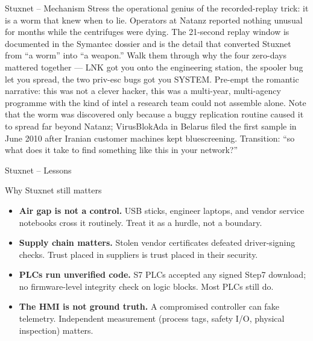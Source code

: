 \documentclass[aspectratio=169,11pt]{beamer}
\begin{document}
\begin{frame}{Stuxnet -- Mechanism}
{  Stress the operational genius of the recorded-replay trick: it is a worm that knew when to lie. Operators at Natanz reported nothing unusual for months while the centrifuges were dying. The 21-second replay window is documented in the Symantec dossier and is the detail that converted Stuxnet from ``a worm'' into ``a weapon.'' Walk them through why the four zero-days mattered together --- LNK got you onto the engineering station, the spooler bug let you spread, the two priv-esc bugs got you SYSTEM. Pre-empt the romantic narrative: this was not a clever hacker, this was a multi-year, multi-agency programme with the kind of intel a research team could not assemble alone. Note that the worm was discovered only because a buggy replication routine caused it to spread far beyond Natanz; VirusBlokAda in Belarus filed the first sample in June 2010 after Iranian customer machines kept bluescreening. Transition: ``so what does it take to find something like this in your network?''
}
\end{frame}

\begin{frame}{Stuxnet -- Lessons}
\begin{takeawaybox}{Why Stuxnet still matters}
\begin{itemize}\setlength{\itemsep}{2pt}
  \item \textbf{Air gap is not a control.} USB sticks, engineer laptops, and vendor service notebooks cross it routinely. Treat it as a hurdle, not a boundary.
  \item \textbf{Supply chain matters.} Stolen vendor certificates defeated driver-signing checks. Trust placed in suppliers is trust placed in their security.
  \item \textbf{PLCs run unverified code.} S7 PLCs accepted any signed Step7 download; no firmware-level integrity check on logic blocks. Most PLCs still do.
  \item \textbf{The HMI is not ground truth.} A compromised controller can fake telemetry. Independent measurement (process tags, safety I/O, physical inspection) matters.
\end{itemize}
\end{takeawaybox}
\end{frame}
\end{document}
